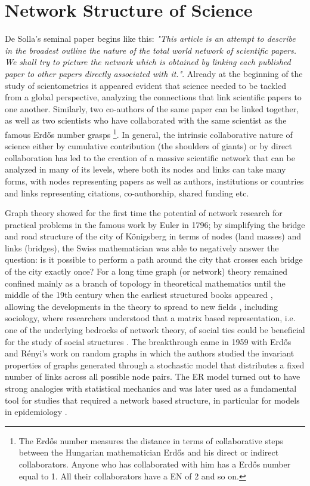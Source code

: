 \chapter{Network Structure of Science} \label{Network Structure of Science}

De Solla's seminal paper \cite{deSollaPrice510} begins like this: \textit{"This article is an attempt to describe in the broadest outline the nature of the total world network of scientific papers. We shall try to picture the network which
is obtained by linking each published paper to other papers directly associated with it."}. Already at the beginning of the study of scientometrics it appeared evident that
science needed to be tackled from a global perspective, analyzing the connections that link scientific papers to one another.
 Similarly, two co-authors of the same paper
can be linked together, as well as two scientists who have collaborated with the same scientist as the famous Erd\H{o}s number grasps \cite{10.2307/2317868} 
\footnote{The Erd\H{o}s number measures the distance in terms of collaborative steps between the Hungarian mathematician Erd\H{o}s and his direct or indirect collaborators. Anyone
who has collaborated with him has a Erd\H{o}s number equal to 1. All their collaborators have a EN of 2 and so on.}. In general, the 
intrinsic collaborative nature of science either by cumulative contribution (the shoulders of giants) or by direct collaboration has led to the creation of a massive
scientific network that can be analyzed in many of its levels, where both its nodes and links can take many forms, with nodes representing papers as well as authors, institutions or countries and links representing
citations, co-authorship, shared funding etc. 

Graph theory showed for the first time the potential of network research for practical problems in the famous work by Euler in 1796; by simplifying the bridge and road structure of the
city of K{\"o}nigsberg in terms of nodes (land masses) and links (bridges), the Swiss mathematician was able to negatively answer the question: is it possible to perform a path around the city that
crosses each bridge of the city exactly once? For a long time graph (or network) theory remained confined mainly as a branch of topology in theoretical mathematics \cite{Cayley1881} until the middle
of the 19th century when the earliest structured books appeared  \cite{0817633898,9782746232150}, allowing the developments in the theory to spread
to new fields \cite{0123242509}, including sociology, where researchers understood that a matrix based representation, i.e. one of the underlying bedrocks of network theory,
of social ties could be beneficial for the study of social structures \cite{Luce1949,10.2307/2088670}. The breakthrough came in 1959 with Erd\H{o}s and R\'{e}nyi's work on
random graphs \cite{citeulike:4012374} in which the authors studied
the invariant properties of graphs generated through a stochastic model that distributes a fixed number of links across all possible node pairs. The ER model turned out to have strong
analogies with statistical mechanics \cite{COHEN1988113} and was later used as a fundamental tool for studies that required a network based structure, in particular 
for models in epidemiology \cite{pmid7608641,Keeling859}. 

